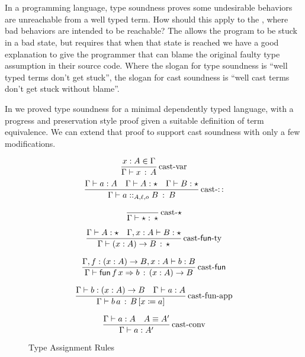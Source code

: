 \section{\CSys{}}
 
In a programming language, type soundness proves some undesirable behaviors are unreachable from a well typed term.
How should this apply to the \clang{}, where bad behaviors are intended to be reachable?
The \clang{} allows the program to be stuck in a bad state, but requires that when that state is reached we have a good explanation to give the programmer that can blame the original faulty type assumption in their source code.
Where the slogan for type soundness is ``well typed terms don't get stuck'', the slogan for cast soundness is ``well cast terms don't get stuck without blame''.

In  we proved type soundness for a minimal dependently typed language, with a progress and preservation style proof given a suitable definition of term equivalence.
We can extend that proof to support cast soundness with only a few modifications.
 
\begin{figure}
\[
\frac{x:A\in \Gamma }{\Gamma \vdash x\,:\,A}
\operatorname{cast-var}
\]
\[
\frac{\Gamma \vdash a:A\quad \Gamma \vdash A:\star\quad \Gamma \vdash B:\star}{\Gamma \vdash a::_{A,\ell ,o}B\::\:B}
\operatorname{cast-::}
\]
 
\[
\frac{\,}{\Gamma \vdash\star:\,\star}
\operatorname{cast-\star}
\]
 
\[
\frac{\Gamma \vdash A:\star\quad \Gamma ,x:A\vdash B:\star}{\Gamma \vdash\left(x:A\right)\rightarrow B\,:\,\star}
\operatorname{cast-\mathsf{fun}-ty}
\]
 
\[
\frac{\Gamma ,f:\left(x:A\right)\rightarrow B,x:A\vdash b:B}{\Gamma \vdash\mathsf{fun}\,f\,x\Rightarrow b\,:\,\left(x:A\right)\rightarrow B}
\operatorname{cast-\mathsf{fun}}
\]
 
\[
\frac{\Gamma \vdash b:\left(x:A\right)\rightarrow B\quad \Gamma \vdash a:A}{\Gamma \vdash b\,a\,:\,B\left[x\coloneqq a\right]}
\operatorname{cast-fun-app}
\]
 
\[
\frac{\Gamma \vdash a:A\quad A\equiv A'}{\Gamma \vdash a:A'}
\operatorname{cast-conv}
\]
 
 
\caption{\CLang{} Type Assignment Rules}
\label{fig:cast-tas-rules}
\end{figure}
 
